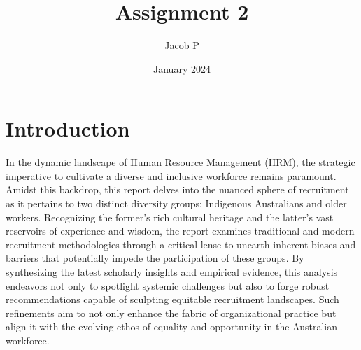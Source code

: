 \documentclass{article}
\title{Assignment 2}
\author{Jacob P }
\date{January 2024}
\begin{document}
\maketitle

\section{Introduction}
In the dynamic landscape of Human Resource Management (HRM), the strategic imperative to cultivate a diverse and inclusive workforce remains paramount. Amidst this backdrop, this report delves into the nuanced sphere of recruitment as it pertains to two distinct diversity groups: Indigenous Australians and older workers. Recognizing the former's rich cultural heritage and the latter's vast reservoirs of experience and wisdom, the report examines traditional and modern recruitment methodologies through a critical lense to unearth inherent biases and barriers that potentially impede the participation of these groups. By synthesizing the latest scholarly insights and empirical evidence, this analysis endeavors not only to spotlight systemic challenges but also to forge robust recommendations capable of sculpting equitable recruitment landscapes. Such refinements aim to not only enhance the fabric of organizational practice but align it with the evolving ethos of equality and opportunity in the Australian workforce.
\end{document}
